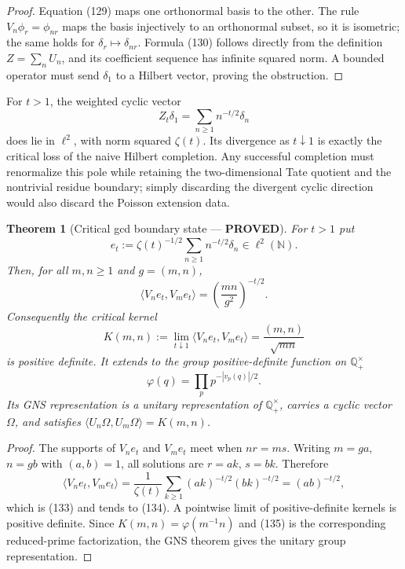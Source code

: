 \documentclass[11pt]{article}
\newtheorem{theorem}{Theorem}
\newcommand{\PROVED}{\textcolor{green!45!black}{\textbf{PROVED}}}
\begin{document}
\begin{proof}
Equation (129) maps one orthonormal basis to the other.  The rule
$V_n\phi_r=\phi_{nr}$ maps the basis injectively to an orthonormal subset,
so it is isometric; the same holds for
$\delta_r\mapsto\delta_{nr}$.  Formula (130) follows directly from the
definition $Z=\sum_nU_n$, and its coefficient sequence has infinite squared
norm.  A bounded operator must send $\delta_1$ to a Hilbert vector, proving
the obstruction.
\end{proof}

For $t>1$, the weighted cyclic vector
\begin{equation}
 Z_t\delta_1=\sum_{n\ge1}n^{-t/2}\delta_n             \tag{131}
\end{equation}
does lie in $\ell^2$, with norm squared $\zeta(t)$.  Its divergence as
$t\downarrow1$ is exactly the critical loss of the naive Hilbert completion.
Any successful completion must renormalize this pole while retaining the
two-dimensional Tate quotient and the nontrivial residue boundary; simply
discarding the divergent cyclic direction would also discard the Poisson
extension data.

\begin{theorem}[Critical gcd boundary state --- \PROVED]
For $t>1$ put
\begin{equation}
 e_t:=\zeta(t)^{-1/2}\sum_{n\ge1}n^{-t/2}\delta_n
 \in\ell^2(\mathbb N).                                 \tag{132}
\end{equation}
Then, for all $m,n\ge1$ and $g=(m,n)$,
\begin{equation}
 \langle V_ne_t,V_me_t\rangle
 =\left(\frac{mn}{g^2}\right)^{-t/2}.                 \tag{133}
\end{equation}
Consequently the critical kernel
\begin{equation}
 K(m,n):=\lim_{t\downarrow1}\langle V_ne_t,V_me_t\rangle
 =\frac{(m,n)}{\sqrt{mn}}                              \tag{134}
\end{equation}
is positive definite.  It extends to the group positive-definite function
on $\mathbb Q_+^\times$
\begin{equation}
 \varphi(q)=\prod_p p^{-|v_p(q)|/2}.                   \tag{135}
\end{equation}
Its GNS representation is a unitary representation of
$\mathbb Q_+^\times$, carries a cyclic vector $\Omega$, and satisfies
$\langle U_n\Omega,U_m\Omega\rangle=K(m,n)$.
\end{theorem}

\begin{proof}
The supports of $V_ne_t$ and $V_me_t$ meet when $nr=ms$.  Writing
$m=ga$, $n=gb$ with $(a,b)=1$, all solutions are $r=ak$, $s=bk$.  Therefore
\[
 \langle V_ne_t,V_me_t\rangle
 =\frac1{\zeta(t)}\sum_{k\ge1}(ak)^{-t/2}(bk)^{-t/2}
 =(ab)^{-t/2},
\]
which is (133) and tends to (134).  A pointwise limit of positive-definite
kernels is positive definite.  Since
$K(m,n)=\varphi(m^{-1}n)$ and (135) is the corresponding reduced-prime
factorization, the GNS theorem gives the unitary group representation.
\end{proof}
\end{document}
